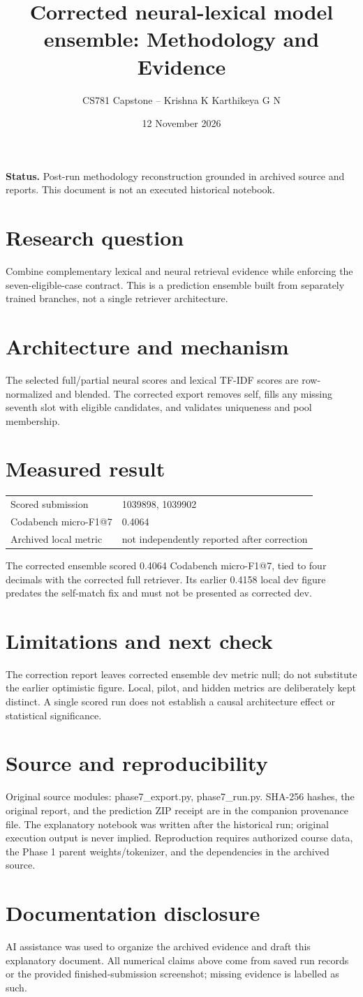 \documentclass[11pt,a4paper]{article}
\title{Corrected neural-lexical model ensemble: Methodology and Evidence}
\author{CS781 Capstone -- Krishna K Karthikeya G N}
\date{12 November 2026}
\begin{document}
\maketitle
\noindent\textbf{Status.} Post-run methodology reconstruction grounded in archived source and reports. This document is not an executed historical notebook.\par
\section*{Research question}
Combine complementary lexical and neural retrieval evidence while enforcing the seven-eligible-case contract. This is a prediction ensemble built from separately trained branches, not a single retriever architecture.
\section*{Architecture and mechanism}
The selected full/partial neural scores and lexical TF-IDF scores are row-normalized and blended. The corrected export removes self, fills any missing seventh slot with eligible candidates, and validates uniqueness and pool membership.
\section*{Measured result}
\begin{center}\begin{tabular}{ll}Scored submission & 1039898, 1039902\\
Codabench micro-F1@7 & 0.4064\\
Archived local metric & not independently reported after correction\end{tabular}\end{center}
The corrected ensemble scored 0.4064 Codabench micro-F1@7, tied to four decimals with the corrected full retriever. Its earlier 0.4158 local dev figure predates the self-match fix and must not be presented as corrected dev.
\section*{Limitations and next check}
The correction report leaves corrected ensemble dev metric null; do not substitute the earlier optimistic figure. Local, pilot, and hidden metrics are deliberately kept distinct. A single scored run does not establish a causal architecture effect or statistical significance.
\section*{Source and reproducibility}
Original source modules: phase7\_export.py, phase7\_run.py. SHA-256 hashes, the original report, and the prediction ZIP receipt are in the companion provenance file. The explanatory notebook was written after the historical run; original execution output is never implied. Reproduction requires authorized course data, the Phase 1 parent weights/tokenizer, and the dependencies in the archived source.
\section*{Documentation disclosure}
AI assistance was used to organize the archived evidence and draft this explanatory document. All numerical claims above come from saved run records or the provided finished-submission screenshot; missing evidence is labelled as such.
\end{document}
